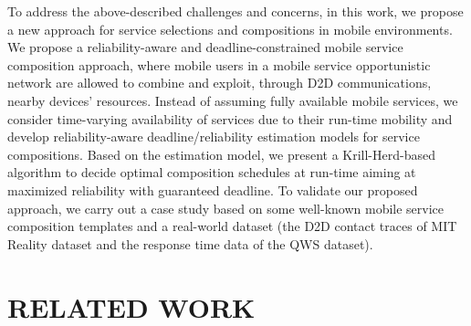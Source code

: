 \documentclass[journal]{IEEEtran}
\begin{document}

To address the above-described challenges and concerns, in this work, we propose a new approach for service selections and compositions in mobile environments. We propose a reliability-aware and deadline-constrained mobile service composition approach, where mobile users in a mobile service opportunistic network are allowed to combine and exploit, through D2D communications, nearby devices' resources. Instead of assuming fully available mobile services, we consider time-varying availability of services due to their run-time mobility and develop reliability-aware deadline/reliability estimation models for service compositions. Based on the estimation model, we present a Krill-Herd-based algorithm to decide optimal composition schedules at run-time aiming at maximized reliability with guaranteed deadline. To validate our proposed approach, we carry out a case study based on some well-known mobile service composition templates and a real-world dataset (the D2D contact traces of MIT Reality dataset and the response time data of the QWS dataset).

\section{RELATED WORK}
\end{document}
